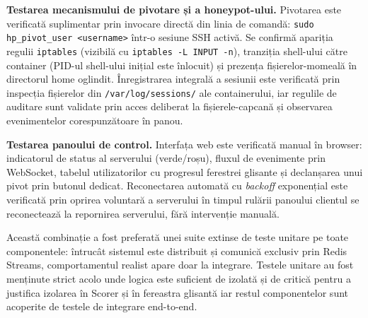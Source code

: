 \textbf{Testarea mecanismului de pivotare și a honeypot-ului.} Pivotarea
este verificată suplimentar prin invocare directă din linia de comandă:
\texttt{sudo hp\_pivot\_user <username>} într-o sesiune SSH activă.
Se confirmă apariția regulii \texttt{iptables} (vizibilă cu
\texttt{iptables -L INPUT -n}), tranziția shell-ului către container
(PID-ul shell-ului inițial este înlocuit) și prezența fișierelor-momeală
în directorul home oglindit. Înregistrarea integrală a sesiunii este
verificată prin inspecția fișierelor din \texttt{/var/log/sessions/} ale
containerului, iar regulile de auditare sunt validate prin acces deliberat
la fișierele-capcană și observarea evenimentelor corespunzătoare în panou.

\textbf{Testarea panoului de control.} Interfața web este verificată
manual în browser: indicatorul de status al serverului (verde/roșu),
fluxul de evenimente prin WebSocket, tabelul utilizatorilor cu progresul
ferestrei glisante și declanșarea unui pivot prin butonul dedicat.
Reconectarea automată cu \textit{backoff} exponențial este verificată prin
oprirea voluntară a serverului în timpul rulării panoului clientul se
reconectează la repornirea serverului, fără intervenție manuală.

Această combinație a fost preferată unei suite extinse de teste unitare pe
toate componentele: întrucât sistemul este distribuit și comunică exclusiv
prin Redis Streams, comportamentul realist apare doar la integrare. Testele
unitare au fost menținute strict acolo unde logica este suficient de izolată
și de critică pentru a justifica izolarea în Scorer și în fereastra glisantă 
iar restul componentelor sunt acoperite de testele de integrare end-to-end.
